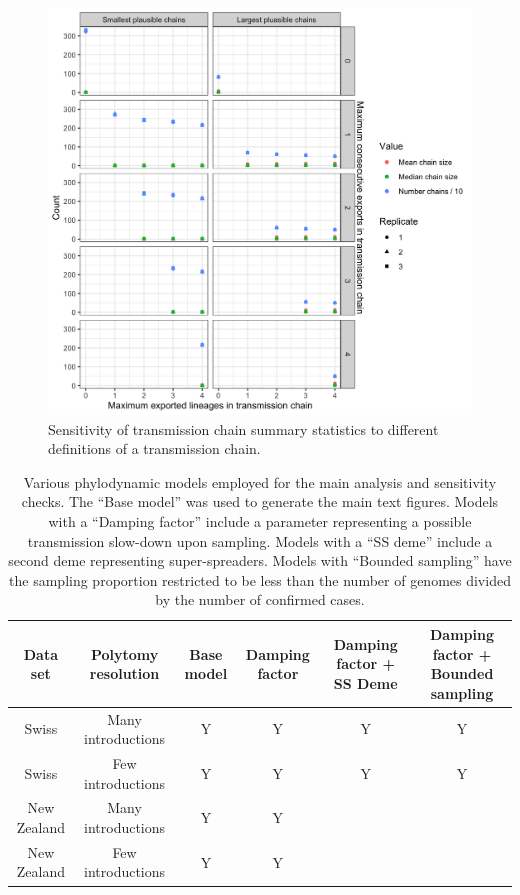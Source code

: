 \documentclass[9pt,twoside,lineno]{pnas-new}
\begin{document}
\begin{figure}
\centering
\includegraphics[width = 11.4cm]{figures/fig_SX_sensitivity_chain_defn.png}
\caption{Sensitivity of transmission chain summary statistics to different definitions of a transmission chain.}  
\label{fig:sensitivity_m_p}
\end{figure}

\newpage
\begin{table}
\caption{Various phylodynamic models employed for the main analysis and sensitivity checks. The ``Base model'' was used to generate the main text figures. Models with a ``Damping factor'' include a parameter representing a possible transmission slow-down upon sampling. Models with a ``SS deme'' include a second deme representing super-spreaders. Models with ``Bounded sampling'' have the sampling proportion restricted to be less than the number of genomes divided by the number of confirmed cases.}
\label{tab:phylo-models}
\begin{tabular}{cccccc}
Data set & Polytomy resolution & Base model & Damping factor & Damping factor + SS Deme & Damping factor + Bounded sampling \\
\midrule
Swiss & Many introductions & Y & Y & Y & Y \\
Swiss & Few introductions & Y & Y & Y & Y \\
New Zealand & Many introductions & Y & Y & & \\
New Zealand & Few introductions & Y & Y & & \\
\bottomrule
\end{tabular}
\end{table}
\end{document}
